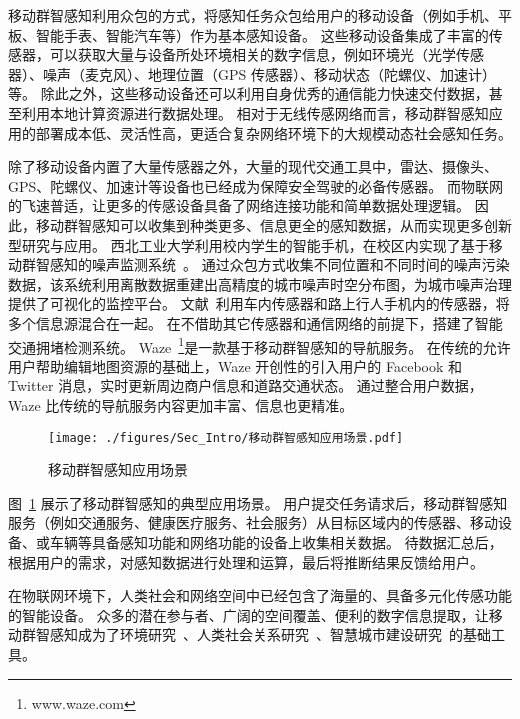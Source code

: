移动群智感知利用众包的方式，将感知任务众包给用户的移动设备（例如手机、平板、智能手表、智能汽车等）作为基本感知设备。
这些移动设备集成了丰富的传感器，可以获取大量与设备所处环境相关的数字信息，例如环境光（光学传感器）、噪声（麦克风）、地理位置（GPS 传感器）、移动状态（陀螺仪、加速计）等。
除此之外，这些移动设备还可以利用自身优秀的通信能力快速交付数据，甚至利用本地计算资源进行数据处理。
相对于无线传感网络而言，移动群智感知应用的部署成本低、灵活性高，更适合复杂网络环境下的大规模动态社会感知任务。

除了移动设备内置了大量传感器之外，大量的现代交通工具中，雷达、摄像头、GPS、陀螺仪、加速计等设备也已经成为保障安全驾驶的必备传感器。
而物联网的飞速普适，让更多的传感设备具备了网络连接功能和简单数据处理逻辑。
因此，移动群智感知可以收集到种类更多、信息更全的感知数据，从而实现更多创新型研究与应用。
西北工业大学利用校内学生的智能手机，在校区内实现了基于移动群智感知的噪声监测系统~\cite{CNKI/2014/CSNSYu}。
通过众包方式收集不同位置和不同时间的噪声污染数据，该系统利用离散数据重建出高精度的城市噪声时空分布图，为城市噪声治理提供了可视化的监控平台。
文献~利用车内传感器和路上行人手机内的传感器，将多个信息源混合在一起。
在不借助其它传感器和通信网络的前提下，搭建了智能交通拥堵检测系统。
Waze~\footnote{www.waze.com}是一款基于移动群智感知的导航服务。
在传统的允许用户帮助编辑地图资源的基础上，Waze 开创性的引入用户的 Facebook 和 Twitter 消息，实时更新周边商户信息和道路交通状态。
通过整合用户数据，Waze 比传统的导航服务内容更加丰富、信息也更精准。

\begin{figure}[!h]
  \centering
  \texttt{[image: ./figures/Sec\_Intro/移动群智感知应用场景.pdf]}
  \vspace{-0.5em}
  \caption{移动群智感知应用场景}
  \vspace{-1em}
  \label{Figure_MCS_Application}
\end{figure}

图~\ref{Figure_MCS_Application} 展示了移动群智感知的典型应用场景。
用户提交任务请求后，移动群智感知服务（例如交通服务、健康医疗服务、社会服务）从目标区域内的传感器、移动设备、或车辆等具备感知功能和网络功能的设备上收集相关数据。
待数据汇总后，根据用户的需求，对感知数据进行处理和运算，最后将推断结果反馈给用户。

在物联网环境下，人类社会和网络空间中已经包含了海量的、具备多元化传感功能的智能设备。
众多的潜在参与者、广阔的空间覆盖、便利的数字信息提取，让移动群智感知成为了环境研究~\cite{DBLP:conf/sensys/DuttaAKMMWW09}、人类社会关系研究~\cite{DBLP:conf/globecom/AslIAM13}、智慧城市建设研究~\cite{DBLP:journals/cm/WangZWCHM16}的基础工具。

